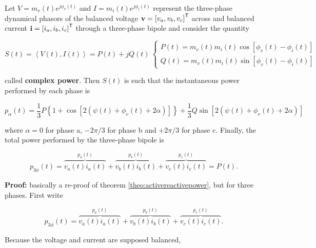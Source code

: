 \begin{theorem}\label{theo:3p_activereactivepower} %
	Let $V = m_v(t)e^{j\phi_v(t)}$ and $I = m_i(t)e^{j\phi_i(t)}$ represent the three-phase dynamical phasors of the balanced voltage $\mathbf{v} = \left[v_a,v_b,v_c\right]^{\mathsf{T}}$ across and balanced current $\mathbf{i} = \left[i_a,i_b,i_c\right]^{\mathsf{T}}$ through a three-phase bipole and consider the quantity 

\begin{equation} S(t) = \left<V(t),I(t)\right> = P(t) + jQ(t)\ \left\{\begin{array}{l} P(t) = m_v(t)m_i(t)\cos\left[\phi_v(t) - \phi_i(t)\right] \\[3mm] Q(t) = m_v(t)m_i(t)\sin\left[\phi_v(t) - \phi_i(t)\right] \end{array}\right. \end{equation}

	\noindent called \textbf{complex power}. Then $S(t)$ is such that the instantaneous power performed by each phase is

\begin{equation} p_\alpha(t) = \dfrac{1}{3}P\left\{1 + \cos\left[2\left(\psi(t) + \phi_v(t) + 2\alpha\right) \right]\right\} + \dfrac{1}{3}Q\sin\left[2\left(\psi(t) + \phi_v(t) + 2\alpha \right)\right]  \end{equation}

	\noindent where $\alpha = 0$ for phase a, $-2\pi/3$ for phase b and $+2\pi/3$ for phase c. Finally, the total power performed by the three-phase bipole is

\begin{equation} p_{3\phi}(t) = \overbrace{v_a(t)i_a(t)}^{p_a(t)} + \overbrace{v_b(t)i_b(t)}^{p_b(t)} + \overbrace{v_c(t)i_c(t)}^{p_c(t)} = P(t).\end{equation}
\end{theorem}
\textbf{Proof:} basically a re-proof of theorem \ref{theo:activereactivepower}, but for three phases. First write

\begin{equation} p_{3\phi}(t) = \overbrace{v_a(t)i_a(t)}^{p_a(t)} + \overbrace{v_b(t)i_b(t)}^{p_b(t)} + \overbrace{v_c(t)i_c(t)}^{p_c(t)}.\end{equation}

	Because the voltage and current are supposed balanced,

